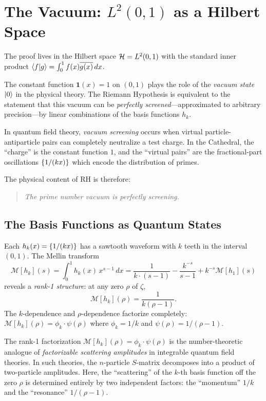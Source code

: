 \documentclass[11pt,a4paper]{article}
\begin{document}
\section{The Vacuum: $L^2(0,1)$ as a Hilbert Space}

The proof lives in the Hilbert space $\mathcal{H} = L^2(0,1)$ with the standard
inner product $\langle f | g \rangle = \int_0^1 f(x)\overline{g(x)}\,dx$.

\begin{principle}
The constant function $\mathbf{1}(x) = 1$ on $(0,1)$ plays the role of
the \emph{vacuum state} $| 0 \rangle$ in the physical theory. The Riemann
Hypothesis is equivalent to the statement that this vacuum can be
\emph{perfectly screened}---approximated to arbitrary precision---by
linear combinations of the basis functions $h_k$.
\end{principle}

In quantum field theory, \emph{vacuum screening} occurs when virtual
particle-antiparticle pairs can completely neutralize a test charge.
In the Cathedral, the ``charge'' is the constant function $1$, and the
``virtual pairs'' are the fractional-part oscillations $\{1/(kx)\}$
which encode the distribution of primes.

The physical content of RH is therefore:
\begin{quote}
\emph{The prime number vacuum is perfectly screening.}
\end{quote}

\subsection{The Basis Functions as Quantum States}

Each $h_k(x) = \{1/(kx)\}$ has a sawtooth waveform with $k$ teeth
in the interval $(0,1)$. The Mellin transform
\[
  \mathcal{M}[h_k](s) = \int_0^1 h_k(x) \, x^{s-1}\,dx = \frac{1}{k \cdot (s-1)}
  - \frac{k^{-s}}{s-1} + k^{-s}\mathcal{M}[h_1](s)
\]
reveals a \emph{rank-1 structure}: at any zero $\rho$ of $\zeta$,
\[
  \mathcal{M}[h_k](\rho) = \frac{1}{k(\rho - 1)}.
\]
The $k$-dependence and $\rho$-dependence factorize completely:
$\mathcal{M}[h_k](\rho) = \phi_k \cdot \psi(\rho)$ where
$\phi_k = 1/k$ and $\psi(\rho) = 1/(\rho-1)$.

\begin{correspondence}[Rank-1 = Factorizable Scattering]
The rank-1 factorization $\mathcal{M}[h_k](\rho) = \phi_k \cdot \psi(\rho)$
is the number-theoretic analogue of \emph{factorizable scattering amplitudes}
in integrable quantum field theories. In such theories, the $n$-particle
$S$-matrix decomposes into a product of two-particle amplitudes. Here,
the ``scattering'' of the $k$-th basis function off the zero $\rho$ is
determined entirely by two independent factors: the ``momentum'' $1/k$
and the ``resonance'' $1/(\rho-1)$.
\end{correspondence}
\end{document}
